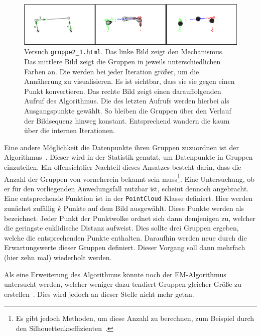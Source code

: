\begin{figure}
    \centering
    \includegraphics[width=\textwidth]{gfx/k_means_centroids_edit.png}
    \caption[Versuch \lstinline{gruppe2_1.html}]{Versuch \lstinline{gruppe2_1.html}. Das linke Bild zeigt den Mechanismus. Das mittlere Bild zeigt die Gruppen in jeweils unterschiedlichen Farben an. Die  werden bei jeder Iteration grö{\ss}er, um die Annäherung zu visualisieren. Es ist sichtbar, dass sie sie gegen einen Punkt konvertieren. Das rechte Bild zeigt einen darauffolgenden Aufruf des Algorithmus. Die  des letzten Aufrufs werden hierbei als Ausgangspunkte gewählt. So bleiben die Gruppen über den Verlauf der Bildsequenz hinweg konstant. Entsprechend wandern die  kaum über die internen Iterationen.}
    \label{fig:gruppe2_1}
\end{figure}

Eine andere Möglichkeit die Datenpunkte ihren Gruppen zuzuordnen ist der  Algorithmus~\cite[S.~241]{Geron2019}.
Dieser wird in der Statistik genutzt, um Datenpunkte in Gruppen einzuteilen.
Ein offensichtlier Nachteil dieses Ansatzes besteht darin, dass die Anzahl der Gruppen von vorneherein bekannt sein muss\footnote{Es gibt jedoch Methoden, um diese Anzahl zu berechnen, zum Beispiel durch den Silhouettenkoeffizienten~\cite[S.~247]{Geron2019}.}.
Eine Untersuchung, ob er für den vorliegenden Anwedungsfall nutzbar ist, scheint dennoch angebracht.
Eine entsprechende Funktion ist in der \lstinline{PointCloud} Klasse definiert.
Hier werden zunächst zufällig $k$ Punkte auf dem Bild ausgewählt.
Diese Punkte werden als  bezeichnet.
Jeder Punkt der Punktwolke ordnet sich dann demjenigen  zu, welcher die geringste euklidische Distanz aufweist.
Dies sollte drei Gruppen ergeben, welche die entsprechenden Punkte enthalten.
Daraufhin werden neue  durch die Erwartungswerte dieser Gruppen definiert.
Dieser Vorgang soll dann mehrfach (hier zehn mal) wiederholt werden.

Als eine Erweiterung des  Algorithmus könnte noch der EM-Algorithmus untersucht werden, welcher weniger dazu tendiert Gruppen gleicher Grö{\ss}e zu erstellen~\cite[S.~262]{Geron2019}.
Dies wird jedoch an dieser Stelle nicht mehr getan.

